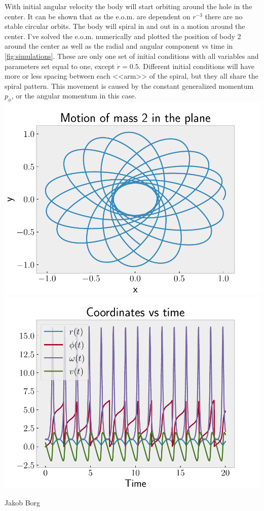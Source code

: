 \documentclass[11pt,a4paper]{report}
\newcounter{excount}[chapter]
\newenvironment{exercise}[1][]{\addtocounter{excount}{1} \noindent {\bf Problem
    \arabic{excount} \ \ #1}\hspace{2mm}}{\vspace{4mm}}
\newenvironment{solution}
    {\begin{tcolorbox}[title=Solution,halign lower=right,breakable]
    }
    {
    \tcblower Jakob Borg
    \end{tcolorbox}
	\vspace{5mm}
    }
\begin{document}
\begin{exercise}
\begin{solution}
\begin{enumerate}[\bf a)]
With initial angular velocity the body will start orbiting around the hole in the center. It can be shown that as the e.o.m. are dependent on $r^{-3}$ there are no stable circular orbits. The body will spiral in and out in a motion around the center. I've solved the e.o.m. numerically and plotted the position of body 2 around the center as well as the radial and angular component vs time in \cref{fig:simulations}. These are only one set of initial conditions with all variables and parameters set equal to one, except $\dot{r}=0.5$. Different initial conditions will have more or less spacing between each <<arm>> of the spiral, but they all share the spiral pattern. This movement is caused by the constant generalized momentum $p_\phi$, or the angular momentum in this case.
\includegraphics[width = 0.49\linewidth]{./figurer/polar_movement.pdf}
\includegraphics[width = 0.49\linewidth]{./figurer/components_vs_time.pdf}
\label{fig:simulations}
\end{enumerate}
\end{solution}
\end{exercise}
\end{document}
